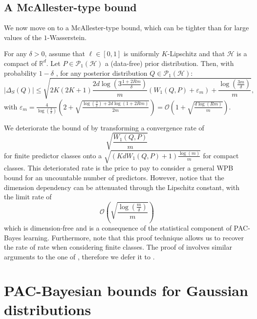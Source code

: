 \subsection{A McAllester-type bound}
We now move on to a McAllester-type bound, which can be tighter than  for large values of the $1$-Wasserstein.

\begin{theorem}
\label{th: compact_mcall}
For any $\delta>0$, assume that $\ell\in[0,1]$ is uniformly $K$-Lipschitz and that $\mathcal{H}$ is a compact of $\mathbb{R}^d$. Let $P\in \mathcal{P}_1(\mathcal{H})$ a (data-free) prior distribution.
Then, with probability $1-\delta$ , for any posterior distribution $Q\in\mathcal{P}_1(\mathcal{H})$:
\[ |\Delta_S(Q)| \leq \sqrt{2K(2K+1)\frac{2d\log\left(3\frac{1 +2Rm }{\delta}\right)}{m} \left(W_1(Q,P)+\varepsilon_m  \right) + \frac{\log\left( \frac{3m}{\delta} \right)}{m}  }, \]
with $\varepsilon_m = \frac{4}{\log(\frac{3}{\delta})} \left( 2 + \sqrt{\frac{\log\left(\frac{3}{\delta}\right) + 2d\log(1+2Rm)}{2m}}  \right) = \mathcal{O}\left(1 + \sqrt{\frac{d\log(Rm)}{m}}\right)$.
\end{theorem}
We deteriorate the bound of \cite{amit2022integral} by transforming a convergence rate of $$\sqrt{\frac{W_1(Q,P)}{m}}$$ for finite predictor classes onto a  $\sqrt{\left(Kd W_1(Q,P)+1\right)\frac{\log(m)}{m}}$ for compact classes. This deteriorated rate is the price to pay to consider a general WPB bound for an uncountable number of predictors. However, notice that the dimension dependency can be attenuated through the Lipschitz constant, with the limit rate of $$\mathcal{O}\left(\sqrt{\frac{\log\left( \frac{m}{\delta} \right)}{m}}\right)$$ which is dimension-free and is a consequence of the statistical component of PAC-Bayes learning. Furthermore, note that this proof technique allows us to recover the rate of \citet{amit2022integral} rate when considering finite classes.
The proof of  involves similar arguments to the one of , therefore we defer it to .

\section{PAC-Bayesian bounds for Gaussian distributions}
\label{sec: wpb_gauss}

